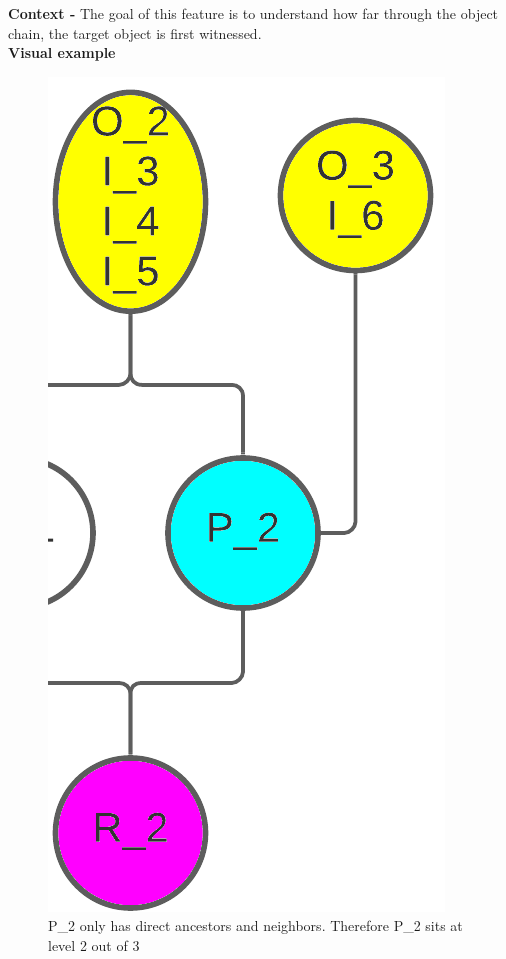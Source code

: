 \documentclass{article}
\begin{document}
\textbf{Context -} The goal of this feature is to understand how far through the object chain, the target object is first witnessed.
\\

\textbf{Visual example}

\begin{figure}[h]
	\centering
	\includegraphics[scale=0.2]{images/obj-lvl.png}
	\caption{P\_2 only has direct ancestors and neighbors. Therefore P\_2 sits at level 2 out of 3}
	\label{fig:obj-lvl}
\end{figure}
\end{document}
